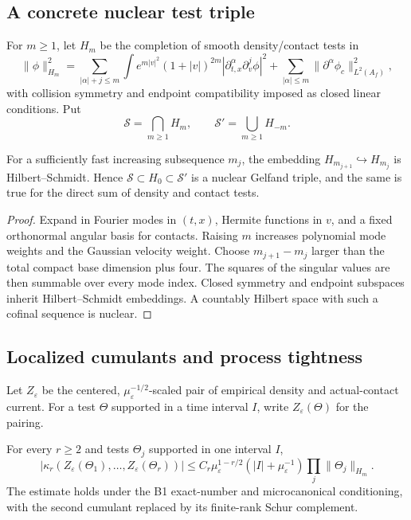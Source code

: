 \subsection{A concrete nuclear test triple}

For $m\ge1$, let $H_m$ be the completion of smooth density/contact tests in
\[
 \|\phi\|_{H_m}^2=
 \sum_{|\alpha|+j\le m}
 \int e^{m|v|^2}(1+|v|)^{2m}
 |\partial_{t,x}^\alpha\partial_v^j\phi|^2
 +\sum_{|\alpha|\le m}\|\partial^\alpha\phi_c\|_{L^2(A_f)}^2,
\]
with collision symmetry and endpoint compatibility imposed as closed linear
conditions.  Put
\[
 \mathscr S=\bigcap_{m\ge1}H_m,
 \qquad \mathscr S'=\bigcup_{m\ge1}H_{-m}.
\]

\begin{lemma}[Nuclearity]
\label{lem:r21-b3-nuclear}
For a sufficiently fast increasing subsequence $m_j$, the embedding
$H_{m_{j+1}}\hookrightarrow H_{m_j}$ is Hilbert--Schmidt.  Hence
$\mathscr S\subset H_0\subset\mathscr S'$ is a nuclear Gelfand triple, and the
same is true for the direct sum of density and contact tests.
\end{lemma}

\begin{proof}
Expand in Fourier modes in $(t,x)$, Hermite functions in $v$, and a fixed
orthonormal angular basis for contacts.  Raising $m$ increases polynomial
mode weights and the Gaussian velocity weight.  Choose
$m_{j+1}-m_j$ larger than the total compact base dimension plus four.  The
squares of the singular values are then summable over every mode index.
Closed symmetry and endpoint subspaces inherit Hilbert--Schmidt embeddings.
A countably Hilbert space with such a cofinal sequence is nuclear.
\end{proof}

\subsection{Localized cumulants and process tightness}

Let $Z_\varepsilon$ be the centered, $\mu_\varepsilon^{-1/2}$-scaled pair of
empirical density and actual-contact current.  For a test $\Theta$ supported
in a time interval $I$, write $Z_\varepsilon(\Theta)$ for the pairing.

\begin{theorem}
\label{thm:r21-b3-cumulants}
For every $r\ge2$ and tests $\Theta_j$ supported in one interval $I$,
\[
 |\kappa_r(Z_\varepsilon(\Theta_1),\ldots,
           Z_\varepsilon(\Theta_r))|
 \le C_r\mu_\varepsilon^{1-r/2}
 (|I|+\mu_\varepsilon^{-1})
 \prod_j\|\Theta_j\|_{H_m}.
\]
The estimate holds under the B1 exact-number and microcanonical conditioning,
with the second cumulant replaced by its finite-rank Schur complement.
\end{theorem}

